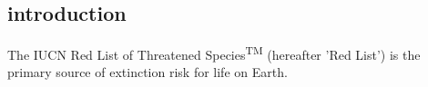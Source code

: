 \subsection{introduction}

The IUCN Red List of Threatened Species\textsuperscript{TM} (hereafter 'Red List') is the primary source of extinction risk for life on Earth.